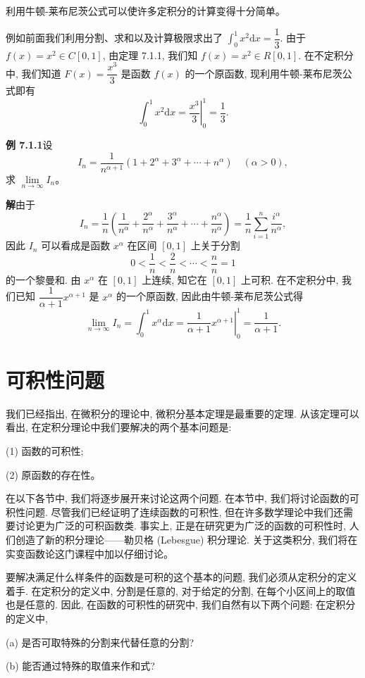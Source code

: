 \documentclass[UTF8,12pt,a4paper,fontset=fandol]{ctexart}
\begin{document}
利用牛顿-莱布尼茨公式可以使许多定积分的计算变得十分简单。

例如前面我们利用分割、求和以及计算极限求出了 $\int_0^1x^2\mathrm dx=\dfrac13$. 由于 $f(x)=x^2\in C[0,1]$, 由定理 7.1.1, 我们知 $f(x)=x^2\in R[0,1]$. 在不定积分中, 我们知道 $F(x)=\dfrac{x^3}{3}$ 是函数 $f(x)$ 的一个原函数, 现利用牛顿-莱布尼茨公式即有
\[
  \int_0^1 x^2\mathrm dx=\left.\frac{x^3}{3}\right|_0^1=\frac13.
\]

\noindent\textbf{例 7.1.1}\quad 设
\[
  I_n=\frac1{n^{\alpha+1}}(1+2^\alpha+3^\alpha+\cdots+n^\alpha)\quad(\alpha>0),
\]
求 $\lim\limits_{n\to\infty}I_n$。

\noindent\textbf{解}\quad 由于
\[
  I_n=\frac1n\left(\frac1{n^\alpha}+\frac{2^\alpha}{n^\alpha}+\frac{3^\alpha}{n^\alpha}+\cdots+\frac{n^\alpha}{n^\alpha}\right)
  =\frac1n\sum_{i=1}^n\frac{i^\alpha}{n^\alpha},
\]
因此 $I_n$ 可以看成是函数 $x^\alpha$ 在区间 $[0,1]$ 上关于分割
\[
  0<\frac1n<\frac2n<\cdots<\frac nn=1
\]
的一个黎曼和. 由 $x^\alpha$ 在 $[0,1]$ 上连续, 知它在 $[0,1]$ 上可积. 在不定积分中, 我们已知 $\dfrac1{\alpha+1}x^{\alpha+1}$ 是 $x^\alpha$ 的一个原函数, 因此由牛顿-莱布尼茨公式得
\[
  \lim_{n\to\infty}I_n=\int_0^1 x^\alpha\mathrm dx
  =\left.\frac1{\alpha+1}x^{\alpha+1}\right|_0^1
  =\frac1{\alpha+1}.
\]

\section{可积性问题}

我们已经指出, 在微积分的理论中, 微积分基本定理是最重要的定理. 从该定理可以看出, 在定积分理论中我们要解决的两个基本问题是:

(1) 函数的可积性;

(2) 原函数的存在性。

在以下各节中, 我们将逐步展开来讨论这两个问题. 在本节中, 我们将讨论函数的可积性问题. 尽管我们已经证明了连续函数的可积性, 但在许多数学理论中我们还需要讨论更为广泛的可积函数类. 事实上, 正是在研究更为广泛的函数的可积性时, 人们创造了新的积分理论——勒贝格 (Lebesgue) 积分理论. 关于这类积分, 我们将在实变函数论这门课程中加以仔细讨论。

要解决满足什么样条件的函数是可积的这个基本的问题, 我们必须从定积分的定义着手. 在定积分的定义中, 分割是任意的, 对于给定的分割, 在每个小区间上的取值也是任意的. 因此, 在函数的可积性的研究中, 我们自然有以下两个问题: 在定积分的定义中,

(a) 是否可取特殊的分割来代替任意的分割?

(b) 能否通过特殊的取值来作和式?
\end{document}
